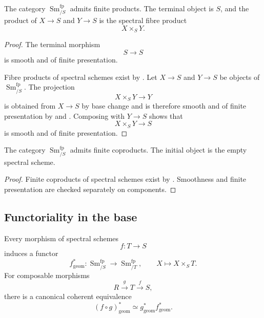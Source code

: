 \begin{proposition}
\label{prop:smooth-site-finite-products}
The category $\operatorname{Sm}^{\mathrm{fp}}_{/S}$ admits finite products.
The terminal object is $S$, and the product of $X\to S$ and $Y\to S$ is
the spectral fibre product
\[
    X\times_SY.
\]
\end{proposition}\begin{proof}
The terminal morphism
\[
    S\longrightarrow S
\]
is smooth and of finite presentation.

Fibre products of spectral schemes exist by
. Let $X\to S$ and $Y\to S$ be
objects of $\operatorname{Sm}^{\mathrm{fp}}_{/S}$. The projection
\[
    X\times_SY
    \longrightarrow
    Y
\]
is obtained from $X\to S$ by base change and is therefore smooth and of
finite presentation by
 and
. Composing with
$Y\to S$ shows that
\[
    X\times_SY
    \longrightarrow
    S
\]
is smooth and of finite presentation.
\end{proof}

\begin{proposition}
\label{prop:smooth-site-finite-coproducts}
The category $\operatorname{Sm}^{\mathrm{fp}}_{/S}$ admits finite
coproducts. The initial object is the empty spectral scheme.
\end{proposition}

\begin{proof}
Finite coproducts of spectral schemes exist by
. Smoothness and finite presentation
are checked separately on components.
\end{proof}

\subsection{Functoriality in the base}

\begin{proposition}
\label{prop:smooth-site-geometric-base-change}
Every morphism of spectral schemes
\[
    f
    \colon
    T
    \longrightarrow
    S
\]
induces a functor
\[
    f^*_{\mathrm{geom}}
    \colon
    \operatorname{Sm}^{\mathrm{fp}}_{/S}
    \longrightarrow
    \operatorname{Sm}^{\mathrm{fp}}_{/T},
    \qquad
    X
    \longmapsto
    X\times_ST.
\]
For composable morphisms
\[
    R
    \xrightarrow{g}
    T
    \xrightarrow{f}
    S,
\]
there is a canonical coherent equivalence
\[
    (f\circ g)^*_{\mathrm{geom}}
    \simeq
    g^*_{\mathrm{geom}}f^*_{\mathrm{geom}}.
\]
\end{proposition}

